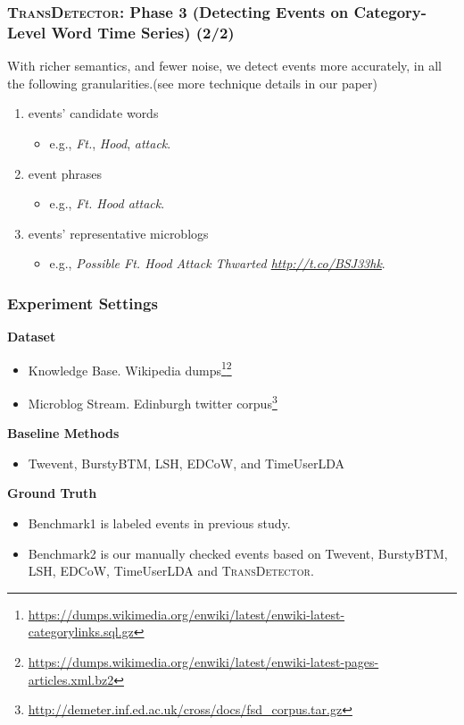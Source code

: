 \documentclass{beamer}
\begin{document}
\begin{frame}
\frametitle{\textsc{TransDetector}: Phase 3 (Detecting Events on Category-Level Word Time Series) (2/2)}
With richer semantics, and fewer noise, we detect events more accurately, in all the following granularities.(see more technique details in our paper)
\begin{enumerate}
	\item events' candidate words
	\begin{itemize}
		\item e.g., \textit{Ft.}, \textit{Hood}, \textit{attack}.
	\end{itemize}
	\item event phrases
	\begin{itemize}
		\item e.g., \textit{Ft. Hood attack}.
	\end{itemize}
	\item events' representative microblogs
	\begin{itemize}
		\item e.g., \textit{Possible Ft. Hood Attack Thwarted \url{http://t.co/BSJ33hk}}.
	\end{itemize}
\end{enumerate}
\end{frame}

\begin{frame}
\frametitle{Experiment Settings}
\textbf{Dataset}
\begin{itemize}
	\item Knowledge Base. Wikipedia dumps\footnote{\url{https://dumps.wikimedia.org/enwiki/latest/enwiki-latest-categorylinks.sql.gz}}\footnote{\url{https://dumps.wikimedia.org/enwiki/latest/enwiki-latest-pages-articles.xml.bz2}}
	\item Microblog Stream. Edinburgh twitter corpus\footnote{\url{http://demeter.inf.ed.ac.uk/cross/docs/fsd_corpus.tar.gz}}
\end{itemize} 

\textbf{Baseline Methods}
\begin{itemize}
	\item Twevent, BurstyBTM, LSH, EDCoW, and TimeUserLDA
\end{itemize}
\textbf{Ground Truth}
\begin{itemize}
	\item Benchmark1 is labeled events in previous study.
	\item Benchmark2 is our manually checked events based on Twevent, BurstyBTM, LSH, EDCoW, TimeUserLDA and \textsc{TransDetector}.
\end{itemize}
\end{frame}
\end{document}

